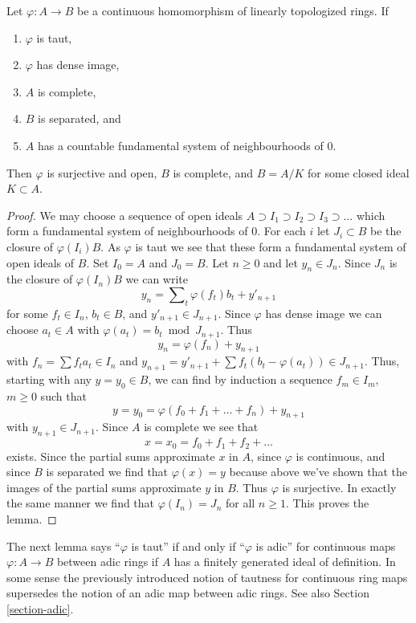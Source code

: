 \begin{lemma}
\label{lemma-dense-image-surjective}
Let $\varphi : A \to B$ be a continuous homomorphism of
linearly topologized rings. If
\begin{enumerate}
\item $\varphi$ is taut,
\item $\varphi$ has dense image,
\item $A$ is complete,
\item $B$ is separated, and
\item $A$ has a countable fundamental system of neighbourhoods of $0$.
\end{enumerate}
Then $\varphi$ is surjective and open, $B$ is complete, and $B = A/K$ for
some closed ideal $K \subset A$.
\end{lemma}

\begin{proof}
We may choose a sequence of open ideals
$A \supset I_1 \supset I_2 \supset I_3 \supset \ldots$
which form a fundamental system of neighbourhoods of $0$.
For each $i$ let $J_i \subset B$ be the closure of $\varphi(I_i)B$.
As $\varphi$ is taut we see that these form a fundamental system
of open ideals of $B$. Set $I_0 = A$ and $J_0 = B$.
Let $n \geq 0$ and let $y_n \in J_n$. Since $J_n$ is the
closure of $\varphi(I_n)B$ we can write
$$
y_n = \sum\nolimits_t \varphi(f_t)b_t + y'_{n + 1}
$$
for some $f_t \in I_n$, $b_t \in B$, and $y'_{n + 1} \in J_{n + 1}$.
Since $\varphi$ has dense image we can choose $a_t \in A$ with
$\varphi(a_t) = b_t \bmod J_{n + 1}$. Thus
$$
y_n = \varphi(f_n) + y_{n + 1}
$$
with $f_n = \sum f_ta_t \in I_n$ and
$y_{n + 1} = y'_{n + 1} + \sum f_t(b_t - \varphi(a_t)) \in J_{n + 1}$.
Thus, starting with any $y = y_0 \in B$, we can find by induction
a sequence $f_m \in I_m$, $m \geq 0$ such that 
$$
y = y_0 = \varphi(f_0 + f_1 + \ldots + f_n) + y_{n + 1}
$$
with $y_{n + 1} \in J_{n + 1}$. Since $A$ is complete we see that
$$
x = x_0 = f_0 + f_1 + f_2 + \ldots
$$
exists. Since the partial sums approximate $x$ in $A$, since $\varphi$
is continuous, and since $B$ is separated we find that $\varphi(x) = y$
because above we've shown that the images of the partial sums approximate $y$
in $B$. Thus $\varphi$ is surjective. In exactly the same manner we
find that $\varphi(I_n) = J_n$ for all $n \geq 1$. This proves the lemma.
\end{proof}

\noindent
The next lemma says ``$\varphi$ is taut'' if and only if ``$\varphi$ is adic''
for continuous maps $\varphi : A \to B$ between adic rings if $A$
has a finitely generated ideal of definition. In some sense the previously
introduced notion of tautness for continuous ring maps supersedes the
notion of an adic map between adic rings. See also Section \ref{section-adic}.


